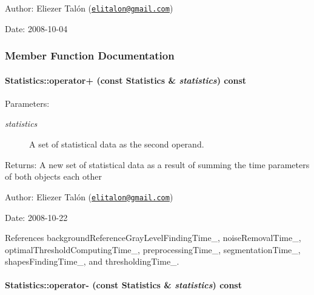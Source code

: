 \begin{Desc}
\item[Author:]Eliezer Talón (\href{mailto:elitalon@gmail.com}{\tt elitalon@gmail.com}) \end{Desc}
\begin{Desc}
\item[Date:]2008-10-04 \end{Desc}


\subsubsection{Member Function Documentation}
\hypertarget{class_statistics_cb07c98a63e07fdb1476ffb282b84676}{
\paragraph[operator+]{ Statistics::operator+ (const {\bf Statistics} \& {\em statistics}) const}\hfill}
\label{class_statistics_cb07c98a63e07fdb1476ffb282b84676}


\begin{Desc}
\item[Parameters:]
\begin{description}
\item[{\em statistics}]A set of statistical data as the second operand.\end{description}
\end{Desc}
\begin{Desc}
\item[Returns:]A new set of statistical data as a result of summing the time parameters of both objects each other\end{Desc}
\begin{Desc}
\item[Author:]Eliezer Talón (\href{mailto:elitalon@gmail.com}{\tt elitalon@gmail.com}) \end{Desc}
\begin{Desc}
\item[Date:]2008-10-22 \end{Desc}


References backgroundReferenceGrayLevelFindingTime\_\-, noiseRemovalTime\_\-, optimalThresholdComputingTime\_\-, preprocessingTime\_\-, segmentationTime\_\-, shapesFindingTime\_\-, and thresholdingTime\_\-.\hypertarget{class_statistics_529bed34d909d88440214d6983779043}{
\paragraph[operator-]{ Statistics::operator- (const {\bf Statistics} \& {\em statistics}) const}\hfill}
\label{class_statistics_529bed34d909d88440214d6983779043}


